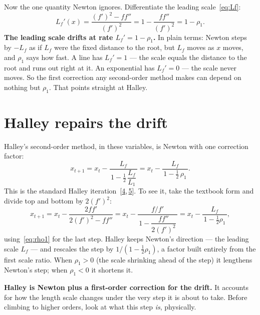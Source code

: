 \documentclass[11pt]{article}
\newcommand{\Lf}{L_{f}}                 %
\newcommand{\Lk}[1]{L_{#1}}             %
\newcommand{\rr}{\rho}                  %
\begin{document}
Now the one quantity Newton ignores. Differentiate the leading scale~\eqref{eq:Lf}:
\begin{equation}
  \Lf'(x)
   = \frac{(f')^2 - f f''}{(f')^2}
   = 1 - \frac{f f''}{(f')^2}
   = 1 - \rr_1.
  \label{eq:drift}
\end{equation}
\textbf{The leading scale drifts at rate $\Lf'=1-\rr_1$.} In plain terms: Newton
steps by $-\Lf$ as if $\Lf$ were the fixed distance to the root, but $\Lf$ moves as
$x$ moves, and $\rr_1$ says how fast. A line has $\Lf'=1$ --- the scale equals the
distance to the root and runs out right at it. An exponential has $\Lf'=0$ --- the
scale never moves. So the first correction any second-order method makes can depend
on nothing but $\rr_1$. That points straight at Halley.

\section{Halley repairs the drift}

Halley's second-order method, in these variables, is Newton with one correction
factor:
\begin{equation}
  x_{t+1} = x_t - \frac{\Lf}{\,1 - \tfrac12\,\dfrac{\Lf}{\Lk{1}}\,}
          = x_t - \frac{\Lf}{\,1 - \tfrac12\,\rr_1\,}.
  \label{eq:halley}
\end{equation}
This is the standard Halley iteration~[\hyperlink{ref:4}{4},\,\hyperlink{ref:5}{5}].
To see it, take the textbook form and divide top and bottom by $2(f')^2$:
\begin{equation}
  x_{t+1}
   = x_t - \frac{2 f f'}{2 (f')^2 - f f''}
   = x_t - \frac{f/f'}{\,1 - \dfrac{f f''}{2 (f')^2}\,}
   = x_t - \frac{\Lf}{\,1 - \tfrac12\rr_1\,},
  \label{eq:halley-derive}
\end{equation}
using~\eqref{eq:rho1} for the last step. Halley keeps Newton's direction --- the
leading scale $\Lf$ --- and rescales the step by $1/(1-\tfrac12\rr_1)$, a factor
built entirely from the first scale ratio. When $\rr_1>0$ (the scale shrinking ahead
of the step) it lengthens Newton's step; when $\rr_1<0$ it shortens it.

\textbf{Halley is Newton plus a first-order correction for the drift.} It accounts
for how the length scale changes under the very step it is about to take. Before
climbing to higher orders, look at what this step \emph{is}, physically.

\end{document}
